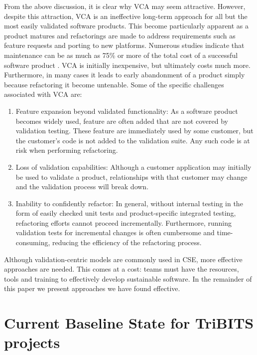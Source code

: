 \documentclass[11pt]{SANDreport}
\begin{document}
From the above discussion, it is clear why VCA may seem attractive. However, despite this attraction, VCA is an ineffective long-term approach for all but the most easily validated software products. This become particularly apparent as a product matures and refactorings are made to address requirements such as feature requests and porting to new platforms.  Numerous studies indicate that maintenance can be as much as 75\% or more of the total cost of a successful software product {}\cite{CodeComplete2nd04}.  VCA is initially inexpensive, but ultimately costs much more.  Furthermore, in many cases it leads to early abandonment of a product simply because refactoring it become untenable.  Some of the specific challenges associated with VCA are:

\begin{enumerate}

{}\item Feature expansion beyond validated functionality: As a software product becomes widely used, feature are often added that are not covered by validation testing.  These feature are immediately used by some customer, but the customer's code is not added to the validation suite.  Any such code is at risk when performing refactoring.

{}\item Loss of validation capabilities: Although a customer application may initially be used to validate a product, relationships with that customer may change and the validation process will break down.

{}\item Inability to confidently refactor: In general, without internal testing in the form of easily checked unit tests and product-specific integrated testing, refactoring efforts cannot proceed incrementally.  Furthermore, running validation tests for incremental changes is often cumbersome and time-consuming, reducing the efficiency of the refactoring process.

\end{enumerate}

Although validation-centric models are commonly used in CSE, more effective approaches are needed.  This comes at a cost: teams must have the resources, tools and training to effectively develop sustainable software.  In the remainder of this paper we present approaches we have found effective.


%
{}\section{Current Baseline State for TriBITS projects}
\label{sec:tribts_current_state}
%
\end{document}
